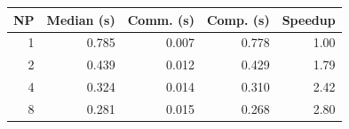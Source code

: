 \begin{tabular}{rrrrr}
  \toprule
  NP & Median (s) & Comm. (s) & Comp. (s) & Speedup \\
  \midrule
  1 & 0.785 & 0.007 & 0.778 & 1.00 \\
  2 & 0.439 & 0.012 & 0.429 & 1.79 \\
  4 & 0.324 & 0.014 & 0.310 & 2.42 \\
  8 & 0.281 & 0.015 & 0.268 & 2.80 \\
  \bottomrule
\end{tabular}
